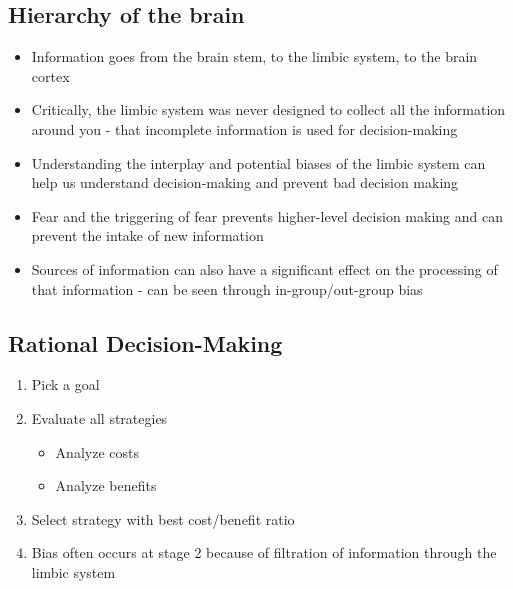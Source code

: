 \documentclass[11pt]{article}
\begin{document}
\subsection{Hierarchy of the brain}
\label{sec:org01b47d3}
\begin{itemize}
\item Information goes from the brain stem, to the limbic system, to the brain cortex
\item Critically, the limbic system was never designed to collect all the information around you - that incomplete information is used for decision-making
\item Understanding the interplay and potential biases of the limbic system can help us understand decision-making and prevent bad decision making
\item Fear and the triggering of fear prevents higher-level decision making and can prevent the intake of new information
\item Sources of information can also have a significant effect on the processing of that information - can be seen through in-group/out-group bias
\end{itemize}
\subsection{Rational Decision-Making}
\label{sec:org4c37d79}
\begin{enumerate}
\item Pick a goal
\item Evaluate all strategies
\begin{itemize}
\item Analyze costs
\item Analyze benefits
\end{itemize}
\item Select strategy with best cost/benefit ratio
\item Bias often occurs at stage 2 because of filtration of information through the limbic system
\end{enumerate}
\end{document}
